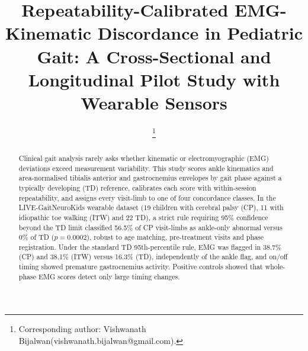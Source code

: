 \documentclass[conference]{IEEEtran}
\begin{document}
\title{Repeatability-Calibrated EMG-Kinematic Discordance in Pediatric Gait: A Cross-Sectional and Longitudinal Pilot Study with Wearable Sensors}

\author{
\thanks{Corresponding author: Vishwanath Bijalwan\protect\newline(vishwanath.bijalwan@gmail.com).}
}

\maketitle

\begin{abstract}
Clinical gait analysis rarely asks whether kinematic or electromyographic (EMG) deviations exceed measurement variability. This study scores ankle kinematics and area-normalised tibialis anterior and gastrocnemius envelopes by gait phase against a typically developing (TD) reference, calibrates each score with within-session repeatability, and assigns every visit-limb to one of four concordance classes. In the LIVE-GaitNeuroKids wearable dataset (19 children with cerebral palsy (CP), 11 with idiopathic toe walking (ITW) and 22 TD), a strict rule requiring 95\% confidence beyond the TD limit classified 56.5\% of CP visit-limbs as ankle-only abnormal versus 0\% of TD ($p=0.0002$), robust to age matching, pre-treatment visits and phase registration. Under the standard TD 95th-percentile rule, EMG was flagged in 38.7\% (CP) and 38.1\% (ITW) versus 16.3\% (TD), independently of the ankle flag, and on/off timing showed premature gastrocnemius activity. Positive controls showed that whole-phase EMG scores detect only large timing changes.
\end{abstract}
\end{document}
